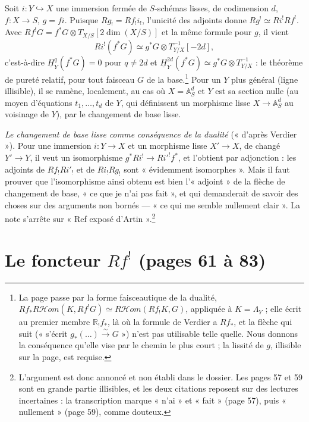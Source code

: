 \documentclass[11pt,a4paper]{article}
\begin{document}
Soit $i : Y \hookrightarrow X$ une immersion fermée de $S$-schémas lisses, de
codimension $d$, $f : X \to S$, $g = fi$. Puisque $Rg_{!} = Rf_{!}i_{!}$,
l'unicité des adjoints donne $Rg^{!} \simeq Ri^{!}Rf^{!}$. Avec $Rf^{!}G =
f^{*}G \otimes T_{X/S}[2\dim(X/S)]$ et la même formule pour $g$, il vient
\[
  Ri^{!}(f^{*}G) \simeq g^{*}G \otimes T_{Y/X}^{-1}[-2d],
\]
c'est-à-dire $\underline{H}^{q}_{Y}(f^{*}G) = 0$ pour $q \neq 2d$ et
$\underline{H}^{2d}_{Y}(f^{*}G) \simeq g^{*}G \otimes T_{Y/X}^{-1}$ : le théorème
de pureté relatif, pour tout faisceau $G$ de la base.\footnote{La page passe
par la forme faisceautique de la dualité,
$Rf_{*}R\mathcal{H}om(K, Rf^{!}G) \simeq R\mathcal{H}om(Rf_{!}K, G)$, appliquée
à $K = \Lambda_{Y}$ ; elle écrit au premier membre $\mathbb{R}_{!}f_{*}$, là
où la formule de Verdier a $Rf_{*}$, et la flèche qui suit (« s'écrit
$g_{*}(\dots) \xrightarrow{\sim} G$ ») n'est pas utilisable telle quelle. Nous
donnons la conséquence qu'elle vise par le chemin le plus court ; la
lissité de $g$, illisible sur la page, est requise.} Pour un $Y$ plus général
(ligne illisible), il se ramène, localement, au cas où $X = \mathbb{A}^{d}_{S}$
et $Y$ est sa section nulle (au moyen d'équations $t_{1}, \dots, t_{d}$ de
$Y$, qui définissent un morphisme lisse $X \to \mathbb{A}^{d}_{S}$ au voisinage
de $Y$), par le changement de base lisse.

\emph{Le changement de base lisse comme conséquence de la dualité}
(« d'après Verdier »). Pour une immersion $i : Y \to X$ et un morphisme lisse
$X' \to X$, de changé $Y' \to Y$, il veut un isomorphisme $g^{*}Ri^{!} \to
Ri'^{!}f^{*}$, et l'obtient par adjonction : les adjoints de $Rf_{!}Ri'_{!}$ et
de $Ri_{!}Rg_{!}$ sont « évidemment isomorphes ». Mais il faut prouver que
l'isomorphisme ainsi obtenu est bien l'« adjoint » de la flèche de changement de
base, « ce que je n'ai pas fait », et qui demanderait de savoir des choses sur
des arguments non bornés --- « ce qui me semble nullement clair ». La note
s'arrête sur « Ref exposé d'Artin ».\footnote{L'argument est donc annoncé et
non établi dans le dossier. Les pages 57 et 59 sont en grande partie
illisibles, et les deux citations reposent sur des lectures incertaines : la
transcription marque « n'ai » et « fait » (page 57), puis « nullement »
(page 59), comme douteux.}

\section*{Le foncteur $Rf^{!}$ (pages 61 à 83)}
\end{document}
